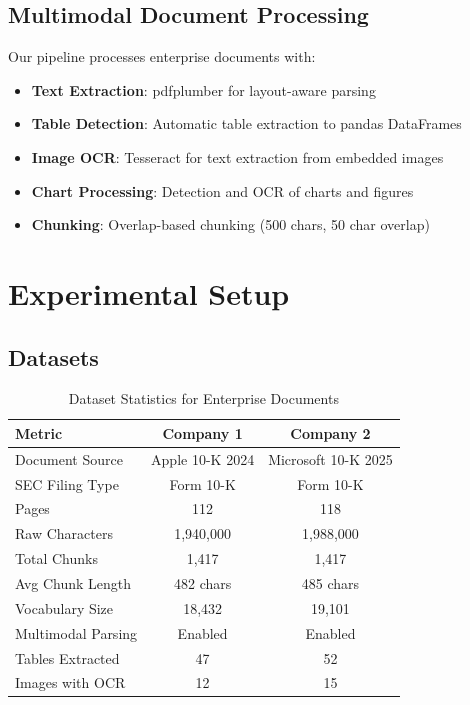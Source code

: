 \documentclass[conference]{IEEEtran}
\begin{document}
\subsection{Multimodal Document Processing}

Our pipeline processes enterprise documents with:
\begin{itemize}
    \item \textbf{Text Extraction}: pdfplumber for layout-aware parsing
    \item \textbf{Table Detection}: Automatic table extraction to pandas DataFrames
    \item \textbf{Image OCR}: Tesseract for text extraction from embedded images
    \item \textbf{Chart Processing}: Detection and OCR of charts and figures
    \item \textbf{Chunking}: Overlap-based chunking (500 chars, 50 char overlap)
\end{itemize}

\section{Experimental Setup}

\subsection{Datasets}

\begin{table}[h]
\centering
\caption{Dataset Statistics for Enterprise Documents}
\label{tab:datasets}
\begin{tabular}{@{}lcc@{}}
\toprule
\textbf{Metric} & \textbf{Company 1} & \textbf{Company 2} \\
\midrule
Document Source & Apple 10-K 2024 & Microsoft 10-K 2025 \\
SEC Filing Type & Form 10-K & Form 10-K \\
Pages & 112 & 118 \\
Raw Characters & 1,940,000 & 1,988,000 \\
Total Chunks & 1,417 & 1,417 \\
Avg Chunk Length & 482 chars & 485 chars \\
Vocabulary Size & 18,432 & 19,101 \\
Multimodal Parsing & Enabled & Enabled \\
Tables Extracted & 47 & 52 \\
Images with OCR & 12 & 15 \\
\bottomrule
\end{tabular}
\end{table}
\end{document}
